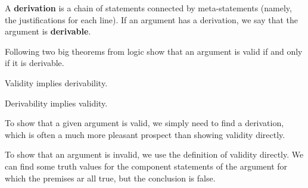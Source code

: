 \documentclass[]{article}
\begin{document}
\begin{defn}[Derivation] A \textbf{derivation} is a chain of statements connected by meta-statements (namely, the justifications for each line). If an argument has a derivation, we say that the argument is \textbf{derivable}.
\end{defn}
Following two big theorems from logic show that an argument is valid if and only if it is derivable.
\begin{thm} Validity implies derivability.
\end{thm}
\begin{thm} Derivability implies validity.
\end{thm}
\begin{rem} To show that a given argument is valid, we simply need to find a derivation, which is often a much more pleasant prospect than showing validity directly.
\end{rem}
\begin{rem} To show that an argument is invalid, we use the definition of validity directly. We can find some truth values for the component statements of the argument for which the premises ar all true, but the conclusion is false.
\end{rem}
    
\end{document}

